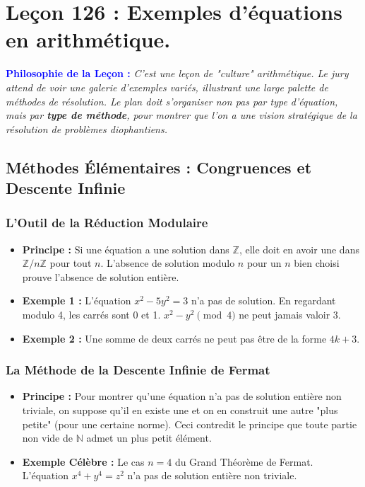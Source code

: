 \documentclass[12pt, a4paper, parskip=full]{report}
\theoremstyle{agregstyle}
\newenvironment{philosophie}
  {\par\medskip\noindent\begin{oframed}\noindent\textbf{\textcolor{blue}{Philosophie de la Leçon :}}\itshape}
  {\end{oframed}\par\medskip}
\begin{document}
\newpage
\chapter{Leçon 126 : Exemples d'équations en arithmétique.}

\begin{philosophie}
    C'est une leçon de "culture" arithmétique. Le jury attend de voir une galerie d'exemples variés, illustrant une large palette de méthodes de résolution. Le plan doit s'organiser non pas par type d'équation, mais par \textbf{type de méthode}, pour montrer que l'on a une vision stratégique de la résolution de problèmes diophantiens.
\end{philosophie}

\section{Méthodes Élémentaires : Congruences et Descente Infinie}
\subsection{L'Outil de la Réduction Modulaire}
\begin{itemize}
    \item \textbf{Principe :} Si une équation a une solution dans $\mathbb{Z}$, elle doit en avoir une dans $\mathbb{Z}/n\mathbb{Z}$ pour tout $n$. L'absence de solution modulo $n$ pour un $n$ bien choisi prouve l'absence de solution entière.
    \item \textbf{Exemple 1 :} L'équation $x^2 - 5y^2 = 3$ n'a pas de solution. En regardant modulo 4, les carrés sont 0 et 1. $x^2-y^2 \pmod 4$ ne peut jamais valoir 3.
    \item \textbf{Exemple 2 :} Une somme de deux carrés ne peut pas être de la forme $4k+3$.
\end{itemize}
\subsection{La Méthode de la Descente Infinie de Fermat}
\begin{itemize}
    \item \textbf{Principe :} Pour montrer qu'une équation n'a pas de solution entière non triviale, on suppose qu'il en existe une et on en construit une autre "plus petite" (pour une certaine norme). Ceci contredit le principe que toute partie non vide de $\mathbb{N}$ admet un plus petit élément.
    \item \textbf{Exemple Célèbre :} Le cas $n=4$ du Grand Théorème de Fermat. L'équation $x^4+y^4=z^2$ n'a pas de solution entière non triviale.
\end{itemize}
\end{document}
